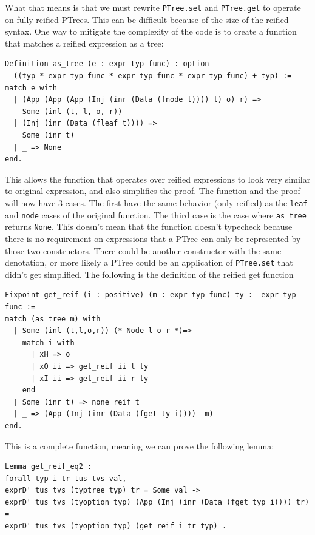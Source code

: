 \documentclass{puthesis}
\begin{document}
What that means is that we must rewrite \lstinline|PTree.set| and
\lstinline|PTree.get| to operate on fully reified PTrees. This can be
difficult because of the size of the reified syntax. One way to
mitigate the complexity of the code is to create a function that
matches a reified expression as a tree:

\begin{verbatim}
Definition as_tree (e : expr typ func) : option
  ((typ * expr typ func * expr typ func * expr typ func) + typ) := 
match e with
  | (App (App (App (Inj (inr (Data (fnode t)))) l) o) r) =>
    Some (inl (t, l, o, r))
  | (Inj (inr (Data (fleaf t)))) =>
    Some (inr t)
  | _ => None
end.
\end{verbatim}

This allows the function that operates over reified expressions to look very
similar to original expression, and also simplifies the proof. The function
and the proof will now have 3 cases. The first have the same behavior (only reified)
as the \lstinline|leaf| and \lstinline|node| cases of the original function. The third
case is the case where \lstinline|as_tree| returns \lstinline|None|. This doesn't
mean that the function doesn't typecheck because there is no requirement on 
expressions that a PTree can only be represented by those two constructors. There
could be another constructor with the same denotation, or more likely a PTree
could be an application of \lstinline|PTree.set| that didn't get
simplified. The following is the definition of the reified get function

\begin{lstlisting}
Fixpoint get_reif (i : positive) (m : expr typ func) ty :  expr typ func :=
match (as_tree m) with
  | Some (inl (t,l,o,r)) (* Node l o r *)=>
    match i with 
      | xH => o
      | xO ii => get_reif ii l ty 
      | xI ii => get_reif ii r ty 
    end
  | Some (inr t) => none_reif t
  | _ => (App (Inj (inr (Data (fget ty i))))  m)
end.
\end{lstlisting}

This is a complete function, meaning we can prove the following lemma:

\begin{lstlisting}
Lemma get_reif_eq2 :
forall typ i tr tus tvs val,
exprD' tus tvs (typtree typ) tr = Some val ->
exprD' tus tvs (tyoption typ) (App (Inj (inr (Data (fget typ i)))) tr)  =
exprD' tus tvs (tyoption typ) (get_reif i tr typ) .
\end{lstlisting}
\end{document}
